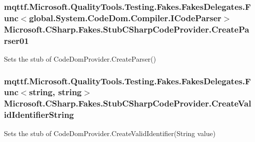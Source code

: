\hypertarget{class_microsoft_1_1_c_sharp_1_1_fakes_1_1_stub_c_sharp_code_provider_addca7fd499ba66b174ac7c56be9194ba}{
\subsubsection[{Create\-Parser01}]{\setlength{\rightskip}{0pt plus 5cm}mqttf.\-Microsoft.\-Quality\-Tools.\-Testing.\-Fakes.\-Fakes\-Delegates.\-Func$<$global.\-System.\-Code\-Dom.\-Compiler.\-I\-Code\-Parser$>$ Microsoft.\-C\-Sharp.\-Fakes.\-Stub\-C\-Sharp\-Code\-Provider.\-Create\-Parser01}}\label{class_microsoft_1_1_c_sharp_1_1_fakes_1_1_stub_c_sharp_code_provider_addca7fd499ba66b174ac7c56be9194ba}


Sets the stub of Code\-Dom\-Provider.\-Create\-Parser()

\hypertarget{class_microsoft_1_1_c_sharp_1_1_fakes_1_1_stub_c_sharp_code_provider_a01021a676c66b959231166c1f882df09}{
\subsubsection[{Create\-Valid\-Identifier\-String}]{\setlength{\rightskip}{0pt plus 5cm}mqttf.\-Microsoft.\-Quality\-Tools.\-Testing.\-Fakes.\-Fakes\-Delegates.\-Func$<$string, string$>$ Microsoft.\-C\-Sharp.\-Fakes.\-Stub\-C\-Sharp\-Code\-Provider.\-Create\-Valid\-Identifier\-String}}\label{class_microsoft_1_1_c_sharp_1_1_fakes_1_1_stub_c_sharp_code_provider_a01021a676c66b959231166c1f882df09}


Sets the stub of Code\-Dom\-Provider.\-Create\-Valid\-Identifier(\-String value)

